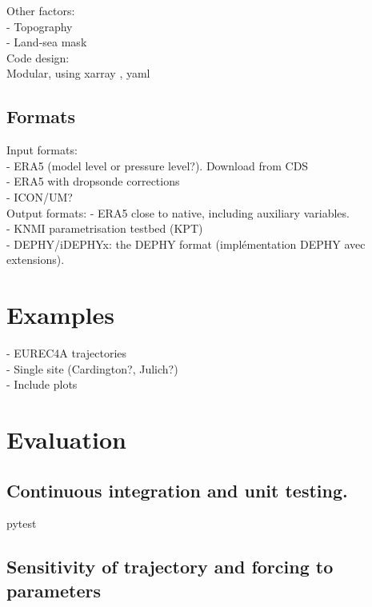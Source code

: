 \documentclass[a4paper,11pt]{article}
\begin{document}
Other factors: \\
- Topography \\
- Land-sea mask \\

Code design: \\
Modular, using xarray \citep{hoyer2017}, yaml \citep{ben2009}

\subsection{Formats}

Input formats: \\
- ERA5 (model level or pressure level?). Download from CDS \citep{raoult2017} \\
- ERA5 with dropsonde corrections \citep{bony2019} \\
- ICON/UM? \\

Output formats:
- ERA5 close to native, including auxiliary variables. \\
- KNMI parametrisation testbed (KPT) \\
- DEPHY/iDEPHYx: the DEPHY format (implémentation DEPHY avec extensions). \\

\section{Examples}

- EUREC4A trajectories \cite{bony2017} \\
- Single site (Cardington?, Julich?) \\
- Include plots

\section{Evaluation}

\subsection{Continuous integration and unit testing.}

pytest \citep{okken2017}

\subsection{Sensitivity of trajectory and forcing to parameters}
\end{document}
